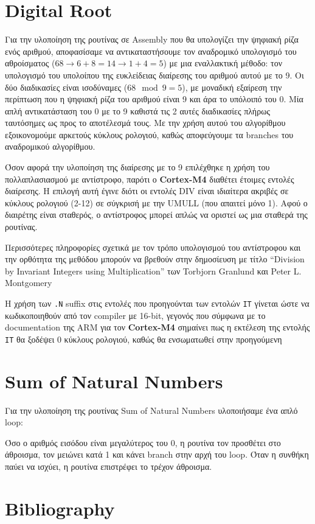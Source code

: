 \documentclass[11pt]{article}
\begin{document}
\section{Digital Root}
\label{sec:org93040ec}
Για την υλοποίηση της ρουτίνας σε Assembly που θα υπολογίζει την
ψηφιακή ρίζα ενός αριθμού, αποφασίσαμε να αντικαταστήσουμε τον
αναδρομικό υπολογισμό του αθροίσματος (\(68 \to 6 + 8 = 14 \to 1 + 4 = 5\))
με μια εναλλακτική μέθοδο: τον υπολογισμό του υπολοίπου της
ευκλείδειας διαίρεσης του αριθμού αυτού με το 9. Οι δύο διαδικασίες
είναι ισοδύναμες (\(68\mod 9 = 5\)), με μοναδική εξαίρεση την περίπτωση
που η ψηφιακή ρίζα του αριθμού είναι 9 και άρα το υπόλοιπό του 0. Μία
απλή αντικατάσταση του 0 με το 9 καθιστά τις 2 αυτές διαδικασίες
πλήρως ταυτόσημες ως προς το αποτέλεσμά τους. Με την χρήση αυτού του
αλγορίθμου εξοικονομούμε αρκετούς κύκλους ρολογιού, καθώς αποφεύγουμε
τα branches του αναδρομικού αλγορίθμου.

Όσον αφορά την υλοποίηση της διαίρεσης με το 9 επιλέχθηκε η χρήση του
πολλαπλασιασμού με αντίστροφο, παρότι ο \textbf{Cortex-M4} διαθέτει έτοιμες
εντολές διαίρεσης. Η επιλογή αυτή έγινε διότι οι εντολές DIV είναι
ιδιαίτερα ακριβές σε κύκλους ρολογιού (2-12) σε σύγκρισή με την UMULL
(που απαιτεί μόνο 1). Αφού ο διαιρέτης είναι σταθερός, ο αντίστροφος
μπορεί απλώς να οριστεί ως μια σταθερά της ρουτίνας.

Περισσότερες πληροφορίες σχετικά με τον τρόπο υπολογισμού του
αντίστροφου και την ορθότητα της μεθόδου μπορούν να βρεθούν στην
δημοσίευση με τίτλο “Division by Invariant Integers using
Multiplication” των Torbjorn Granlund και Peter L. Montgomery\cite{granlundDivisionInvariantIntegers}

Η χρήση των \texttt{.N} suffix στις εντολές που προηγούνται των εντολών \texttt{IT}
γίνεται ώστε να κωδικοποιηθούν από τον compiler με 16-bit, γεγονός που
σύμφωνα με το documentation της ARM για τον \textbf{Cortex-M4} σημαίνει πως η
εκτέλεση της εντολής \texttt{IT} θα ξοδέψει 0 κύκλους ρολογιού, καθώς θα
ενσωματωθεί στην προηγούμενη\cite{DocumentationArmDeveloper}
\section{Sum of Natural Numbers}
\label{sec:org094e030}
Για την υλοποίηση της ρουτίνας Sum of Natural Numbers υλοποιήσαμε ένα
απλό loop:

Όσο ο αριθμός εισόδου είναι μεγαλύτερος του 0, η ρουτίνα τον προσθέτει
στο άθροισμα, τον μειώνει κατά 1 και κάνει branch στην αρχή του loop.
Όταν η συνθήκη παύει να ισχύει, η ρουτίνα επιστρέφει το τρέχον
άθροισμα.
\section{Bibliography}
\label{sec:orgdf1f8cf}
 

\end{document}
